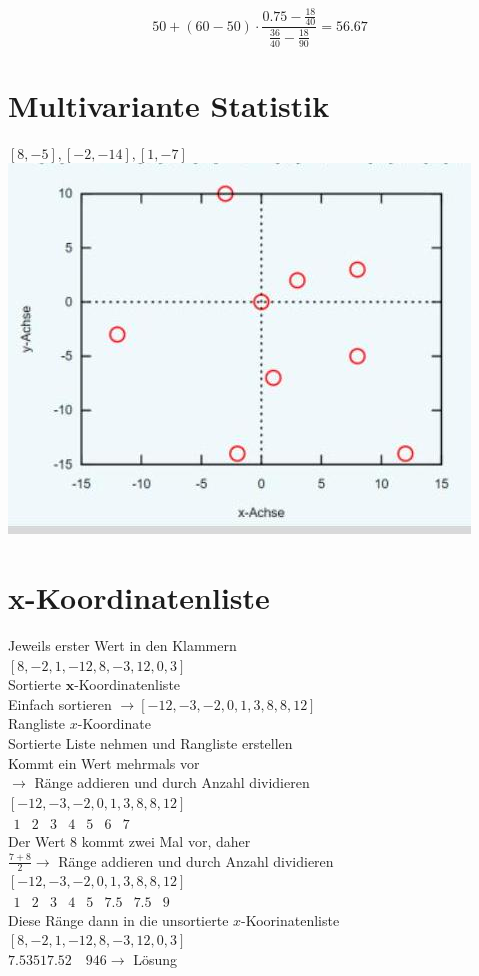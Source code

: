 \documentclass[10pt]{article}
\begin{document}
$$
50+(60-50) \cdot \frac{0.75-\frac{18}{40}}{\frac{36}{40}-\frac{18}{90}}=56.67
$$

\section*{Multivariante Statistik}
$[8,-5],[-2,-14],[1,-7]$\\
\includegraphics[max width=\textwidth, center]{2024_12_29_0906b02acf849bda8665g-1(6)}

\section*{x-Koordinatenliste}
Jeweils erster Wert in den Klammern\\
$[8,-2,1,-12,8,-3,12,0,3]$\\
Sortierte $\mathbf{x}$-Koordinatenliste\\
Einfach sortieren $\rightarrow[-12,-3,-2,0,1,3,8,8,12]$\\
Rangliste $x$-Koordinate\\
Sortierte Liste nehmen und Rangliste erstellen\\
Kommt ein Wert mehrmals vor\\
$\rightarrow$ Ränge addieren und durch Anzahl dividieren\\
$[-12,-3,-2,0,1,3,8,8,12]$\\
$\begin{array}{ccccccc}1 & 2 & 3 & 4 & 5 & 6 & 7\end{array}$\\
Der Wert 8 kommt zwei Mal vor, daher\\
$\frac{7+8}{2} \rightarrow$ Ränge addieren und durch Anzahl dividieren\\
$[-12,-3,-2,0,1,3,8,8,12]$\\
$\begin{array}{lllllllll}1 & 2 & 3 & 4 & 5 & 7.5 & 7.5 & 9\end{array}$\\
Diese Ränge dann in die unsortierte $x$-Koorinatenliste\\
$[8,-2,1,-12,8,-3,12,0,3]$\\
$7.53517 .52 \quad 946 \rightarrow$ Lösung
\end{document}

